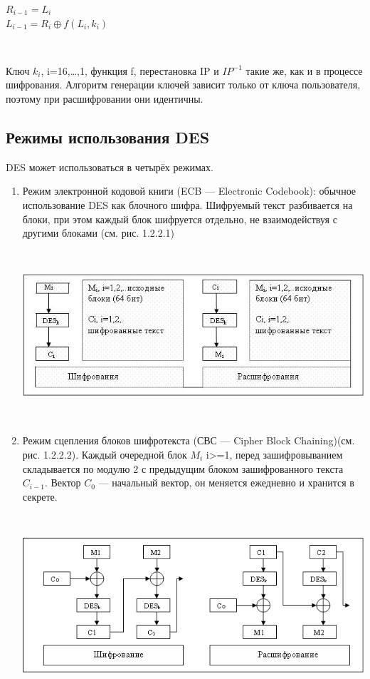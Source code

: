\documentclass[a4paper]{report}
\begin{document}
$R_{i-1} = L_i$ \\
$L_{i-1} = R_i \oplus f(L_i,k_i)$

~

Ключ $k_{i}$, i=16,…,1, функция f, перестановка IP и $IP^{-1}$ такие же, как и в процессе шифрования. Алгоритм генерации ключей зависит только от ключа пользователя, поэтому при расшифровании они идентичны.


\subsection{Режимы использования DES}
DES может использоваться в четырёх режимах.

\begin{enumerate}
\item Режим электронной кодовой книги (ECB — Electronic Codebook): обычное использование DES как блочного шифра. Шифруемый текст разбивается на блоки, при этом каждый блок шифруется отдельно, не взаимодействуя с другими блоками (см. рис. 1.2.2.1)

~

\includegraphics[scale=1.2]{ECB1}
{\\}

~


\item Режим сцепления блоков шифротекста (СВС — Cipher Block Chaining)(см. рис. 1.2.2.2). Каждый очередной блок $M_{i}$ i>=1, перед зашифровыванием складывается по модулю 2 с предыдущим блоком зашифрованного текста $C_{i-1}$. Вектор $C_{0}$ — начальный вектор, он меняется ежедневно и хранится в секрете.

~

\includegraphics[scale=1.1]{CBC}
{\\}


\end{enumerate}
\end{document}

